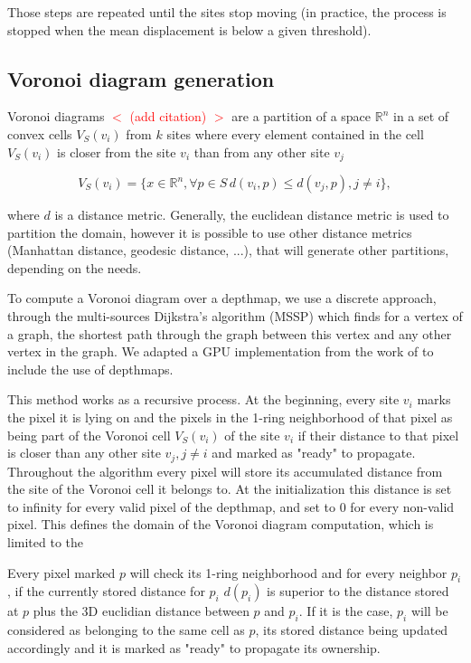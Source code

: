 \documentclass[11pt,fleqn]{book} %
\newcommand{\arnaud}[1]{\textcolor{red}{$<$ #1 $>$}}
\begin{document}
Those steps are repeated until the sites stop moving (in practice, the process is stopped when the mean displacement is below a given threshold).

\subsection{Voronoi diagram generation}
Voronoi diagrams \arnaud{(add citation)} are a partition of a space $\mathbb{R}^n$ in a set of convex cells $V_S(v_i)$ from $k$ sites where every element contained in the cell $V_S(v_i)$ is closer from the site $v_i$ than from any other site $v_j$

\begin{equation}
\label{eq:voronoi_cell}
	V_S(v_i) = \{ x \in \mathbb{R}^n, \forall p \in S\, d(v_i,p) \leq d(v_j,p), j \neq i\},
\end{equation}

where $d$ is a distance metric. Generally, the euclidean distance metric is used to partition the domain, however it is possible to use other distance metrics (Manhattan distance, geodesic distance, ...), that will generate other partitions, depending on the needs.

To compute a Voronoi diagram over a depthmap, we use a discrete approach, through the multi-sources Dijkstra's algorithm (MSSP) \cite{Dij59} which finds for a vertex of a graph, the shortest path through the graph between this vertex and any other vertex in the graph.
We adapted a GPU implementation from the work of \cite{PPA16} to include the use of depthmaps.

This method works as a recursive process. 
At the beginning, every site $v_i$ marks the pixel it is lying on and the pixels in the 1-ring neighborhood of that pixel as being part of the Voronoi cell $V_S(v_i)$ of the site $v_i$ if their distance to that pixel is closer than any other site $v_j, j \neq i$ and marked as "ready" to propagate.
Throughout the algorithm every pixel will store its accumulated distance from the site of the Voronoi cell it belongs to. 
At the initialization this distance is set to infinity for every valid pixel of the depthmap, and set to 0 for every non-valid pixel.
This defines the domain of the Voronoi diagram computation, which is limited to the 

Every pixel marked $p$ will check its 1-ring neighborhood and for every neighbor $p_i$, if the currently stored distance for $p_i$ $d(p_i)$ is superior to the distance stored at $p$ plus the 3D euclidian distance between $p$ and $p_i$. 
If it is the case, $p_i$ will be considered as belonging to the same cell as $p$, its stored distance being updated accordingly and it is marked as "ready" to propagate its ownership.
\end{document}
